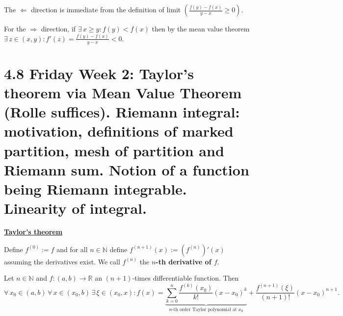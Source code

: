 \documentclass{notes}
\begin{document}
  \begin{prf}
    The $\Leftarrow$ direction is immediate from the definition of limit $\left ( \frac{f(y) - f(x)}{y - x} \geq 0 \right )$.
    
    For the $\Rightarrow$ direction, if $\exists \, x \geq y: f(y) < f(x)$ then by the mean value theorem $\exists \, z \in (x, y): f'(z) = \frac{f(y) - f(x)}{y - x} < 0$.
  \end{prf}
  
  \section{4.8 Friday Week 2: Taylor's theorem via Mean Value Theorem (Rolle suffices). Riemann integral: motivation, definitions of marked partition, mesh of partition and Riemann sum. Notion of a function being Riemann integrable. Linearity of integral.}

  {\boldmath \bfseries \underline{Taylor's theorem}}
  
  \begin{defn}
    Define $f^{(0)} := f$ and for all $n \in \mathbb N$ define $f^{(n + 1)}(x) := \left ( f^{(n)} \right )'(x)$ assuming the derivatives exist.
    We call $f^{(n)}$ the {\boldmath \bfseries $n$-th derivative of $f$}.
  \end{defn}
  
  \begin{thm}
    Let $n \in \mathbb N$ and $f \colon (a, b) \to \mathbb R$ an $(n + 1)$-times differentiable function.
    Then 
    \[
      \forall \, x_0 \in (a, b) \, \forall \, x \in (x_0, b) \, \exists \, \xi \in (x_0, x): f(x) = \underbrace{\sum_{k = 0}^n \frac{f^{(k)}(x_0)}{k!} (x - x_0)^k}_{\text{$n$-th order Taylor polynomial at $x_0$}} {} + \frac{f^{(n + 1)}(\xi)}{(n + 1)!} (x - x_0)^{n + 1}.
    \]
  \end{thm}
  
\end{document}
